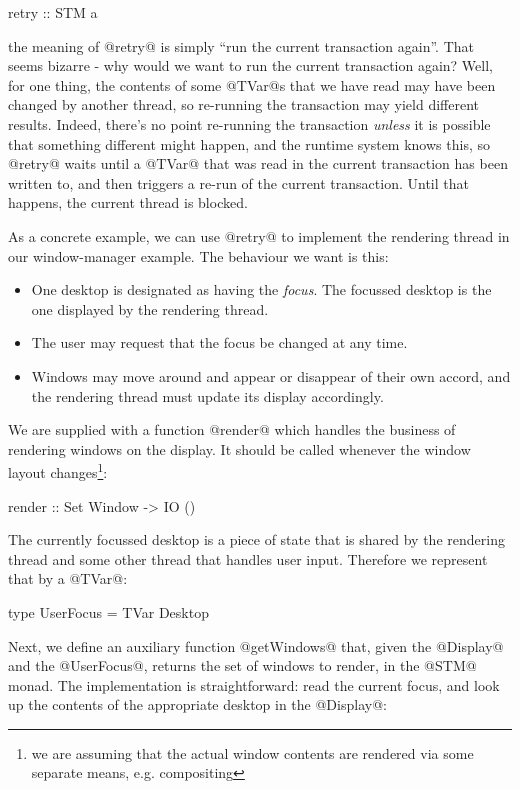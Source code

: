 \begin{haskell}
retry :: STM a
\end{haskell}

\noindent the meaning of @retry@ is simply ``run the current
transaction again''.  That seems bizarre - why would we want to run
the current transaction again?  Well, for one thing, the contents of
some @TVar@s that we have read may have been changed by another
thread, so re-running the transaction may yield different results.
Indeed, there's no point re-running the transaction \emph{unless} it
is possible that something different might happen, and the runtime
system knows this, so @retry@ waits until a @TVar@ that was read in
the current transaction has been written to, and then triggers a
re-run of the current transaction.  Until that happens, the current
thread is blocked.

As a concrete example, we can use @retry@ to implement the rendering
thread in our window-manager example.  The behaviour we want is this:

\begin{itemize}
\item One desktop is designated as having the \emph{focus}.  The
  focussed desktop is the one displayed by the rendering thread.
\item The user may request that the focus be changed at any time.
\item Windows may move around and appear or disappear of their own
  accord, and the rendering thread must update its display
  accordingly.
\end{itemize}

We are supplied with a function @render@ which handles the business of
rendering windows on the display.  It should be called whenever the
window layout changes\footnote{we are assuming that the actual window contents
are rendered via some separate means, e.g. compositing}:

\begin{haskell}
render :: Set Window -> IO ()
\end{haskell}

The currently focussed desktop is a piece of state that is shared by
the rendering thread and some other thread that handles user input.
Therefore we represent that by a @TVar@:

\begin{haskell}
type UserFocus = TVar Desktop
\end{haskell}

Next, we define an auxiliary function @getWindows@ that, given the
@Display@ and the @UserFocus@, returns the set of windows to render,
in the @STM@ monad.  The implementation is straightforward: read the
current focus, and look up the contents of the appropriate desktop in
the @Display@:

